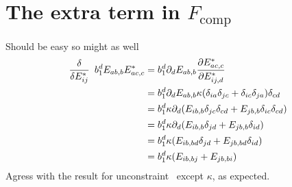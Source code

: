 \documentclass[11pt]{article}
\begin{document}
\section{The extra term in $F_\text{comp}$}
Should be easy so might as well
\begin{align}
    \fdv{E_{ij}^*}\enspace b_1^d E_{ab,b}E_{ac,c}^* &= b_1^d \pp_d E_{ab,b} \pdv{E_{ac,c}^*}{E_{ij,d}^*} \\
    &= b_1^d \pp_d E_{ab,b} \kappa(\delta_{ia}\delta_{jc}+\delta_{ic}\delta_{ja})\delta_{cd} \\
    &= b_1^d \kappa \pp_d (E_{ib,b}\delta_{jc}\delta_{cd} + E_{jb,b}\delta_{ic}\delta_{cd}) \\
    &= b_1^d \kappa \pp_d (E_{ib,b}\delta_{jd} + E_{jb,b}\delta_{id}) \\
    &= b_1^d \kappa (E_{ib,bd}\delta_{jd} + E_{jb,bd}\delta_{id}) \\
    &= b_1^d \kappa (E_{ib,bj} + E_{jb,bi}) \\
\end{align}
Agress with the result for unconstraint \EE\, except $\kappa$, as expected.
\end{document}
